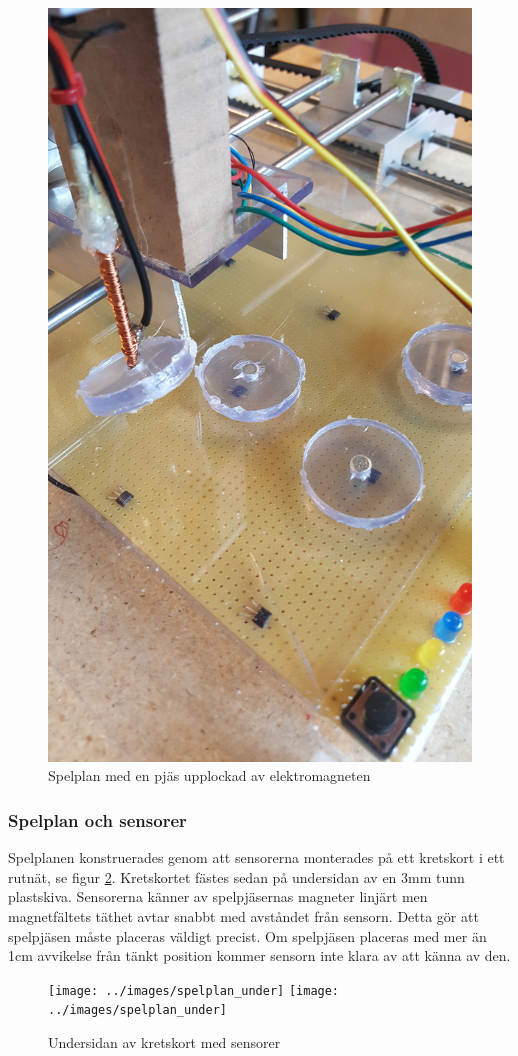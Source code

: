 \documentclass[a4paper]{article}
\begin{document}
\begin{figure}\label{elektromagnet}
\centering
\includegraphics[width=\textwidth,keepaspectratio]{../images/elektromagnet}
\caption{Spelplan med en pjäs upplockad av elektromagneten}
\end{figure}

\subsubsection*{Spelplan och sensorer}
Spelplanen konstruerades genom att sensorerna monterades på ett kretskort i ett rutnät, se figur \ref{board}.
Kretskortet fästes sedan på undersidan av en 3mm tunn plastskiva.
Sensorerna känner av spelpjäsernas magneter linjärt men magnetfältets täthet avtar snabbt med avståndet från sensorn.
Detta gör att spelpjäsen måste placeras väldigt precist.
Om spelpjäsen placeras med mer än 1cm avvikelse från tänkt position kommer sensorn inte klara av att känna av den.
\begin{figure}\label{board}
\centering
\texttt{[image: ../images/spelplan\_under]}
\texttt{[image: ../images/spelplan\_under]}
\caption{Undersidan av kretskort med sensorer}
\end{figure}
\end{document}
